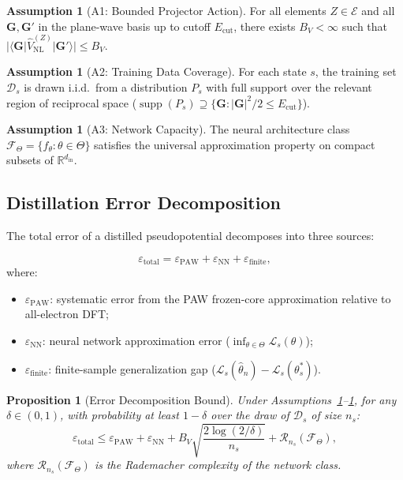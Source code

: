 \documentclass[11pt,a4paper]{article}
\newtheorem{proposition}[theorem]{Proposition}
\theoremstyle{definition}
\newtheorem{assumption}[theorem]{Assumption}
\DeclareMathOperator{\supp}{supp}
\newcommand{\R}{\mathbb{R}}
\begin{document}
\begin{assumption}[A1: Bounded Projector Action]\label{ass:A1}
For all elements $Z \in \mathcal{E}$ and all $\mathbf{G}, \mathbf{G}'$ in the plane-wave basis up to cutoff $E_{\mathrm{cut}}$, there exists $B_V < \infty$ such that $|\langle \mathbf{G} | \hat{V}_{\mathrm{NL}}^{(Z)} | \mathbf{G}' \rangle| \leq B_V$.
\end{assumption}

\begin{assumption}[A2: Training Data Coverage]\label{ass:A2}
For each state $s$, the training set $\mathcal{D}_s$ is drawn i.i.d.\ from a distribution $P_s$ with full support over the relevant region of reciprocal space ($\supp(P_s) \supseteq \{\mathbf{G}: |\mathbf{G}|^2/2 \leq E_{\mathrm{cut}}\}$).
\end{assumption}

\begin{assumption}[A3: Network Capacity]\label{ass:A3}
The neural architecture class $\mathcal{F}_\Theta = \{f_\theta: \theta \in \Theta\}$ satisfies the universal approximation property on compact subsets of $\R^{d_{\mathrm{in}}}$.
\end{assumption}

\subsection{Distillation Error Decomposition}

The total error of a distilled pseudopotential decomposes into three sources:

\begin{equation}\label{eq:error_decomp}
\varepsilon_{\mathrm{total}} = \varepsilon_{\mathrm{PAW}} + \varepsilon_{\mathrm{NN}} + \varepsilon_{\mathrm{finite}},
\end{equation}
where:
\begin{itemize}
    \item $\varepsilon_{\mathrm{PAW}}$: systematic error from the PAW frozen-core approximation relative to all-electron DFT;
    \item $\varepsilon_{\mathrm{NN}}$: neural network approximation error ($\inf_{\theta \in \Theta} \mathcal{L}_s(\theta)$);
    \item $\varepsilon_{\mathrm{finite}}$: finite-sample generalization gap ($\mathcal{L}_s(\hat{\theta}_n) - \mathcal{L}_s(\theta_s^*)$).
\end{itemize}

\begin{proposition}[Error Decomposition Bound]\label{prop:error_bound}
Under Assumptions~\ref{ass:A1}--\ref{ass:A3}, for any $\delta \in (0,1)$, with probability at least $1-\delta$ over the draw of $\mathcal{D}_s$ of size $n_s$:
\begin{equation}\label{eq:error_bound}
\varepsilon_{\mathrm{total}} \leq \varepsilon_{\mathrm{PAW}} + \varepsilon_{\mathrm{NN}} + B_V \sqrt{\frac{2\log(2/\delta)}{n_s}} + \mathcal{R}_{n_s}(\mathcal{F}_\Theta),
\end{equation}
where $\mathcal{R}_{n_s}(\mathcal{F}_\Theta)$ is the Rademacher complexity of the network class.
\end{proposition}
\end{document}
